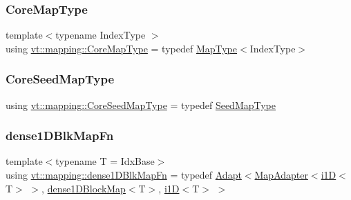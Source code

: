 \mbox{\label{namespacevt_1_1mapping_abff207bec72f006a2e66ff14fc51255a}} 
\subsubsection{\texorpdfstring{Core\+Map\+Type}{CoreMapType}}
{\footnotesize\ttfamily template$<$typename Index\+Type $>$ \\
using \hyperlink{namespacevt_1_1mapping_abff207bec72f006a2e66ff14fc51255a}{vt\+::mapping\+::\+Core\+Map\+Type} = typedef \hyperlink{namespacevt_1_1mapping_a443f8bb8920af5ae1d3391f61fe492a6}{Map\+Type}$<$Index\+Type$>$}

\mbox{\label{namespacevt_1_1mapping_a963a37316992c8805e9a381a07380de0}} 
\subsubsection{\texorpdfstring{Core\+Seed\+Map\+Type}{CoreSeedMapType}}
{\footnotesize\ttfamily using \hyperlink{namespacevt_1_1mapping_a963a37316992c8805e9a381a07380de0}{vt\+::mapping\+::\+Core\+Seed\+Map\+Type} = typedef \hyperlink{namespacevt_1_1mapping_a1c1409d9af8d1ac402af022a65be4a4d}{Seed\+Map\+Type}}

\mbox{\label{namespacevt_1_1mapping_aa1117076bb1d73ecb84905dc391c0528}} 
\subsubsection{\texorpdfstring{dense1\+D\+Blk\+Map\+Fn}{dense1DBlkMapFn}}
{\footnotesize\ttfamily template$<$typename T  = Idx\+Base$>$ \\
using \hyperlink{namespacevt_1_1mapping_aa1117076bb1d73ecb84905dc391c0528}{vt\+::mapping\+::dense1\+D\+Blk\+Map\+Fn} = typedef \hyperlink{namespacevt_1_1mapping_aafe187035ce8df02f31983e37cdb6a5d}{Adapt}$<$\hyperlink{namespacevt_1_1mapping_a41b113c28bb6430fbcb5be66e08ccf9f}{Map\+Adapter}$<$\hyperlink{namespacevt_1_1mapping_af0c14a9a77e0311b3d089143ed93ba76}{i1D}$<$T$>$ $>$, \hyperlink{namespacevt_1_1mapping_a2d49151f03d4ce393b01c620f6b18517}{dense1\+D\+Block\+Map}$<$T$>$, \hyperlink{namespacevt_1_1mapping_af0c14a9a77e0311b3d089143ed93ba76}{i1D}$<$T$>$ $>$}


